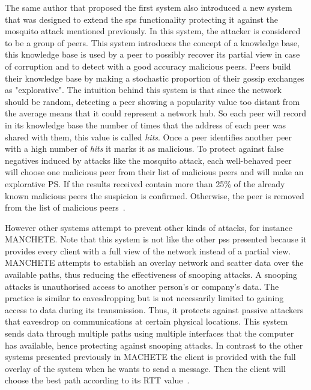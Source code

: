 The same author that proposed the first system also introduced a new system that was designed to extend the \acrshort{sps} functionality protecting it against the mosquito attack mentioned previously. In this system, the attacker is considered to be a group of peers. This system introduces the concept of a knowledge base, this knowledge base is used by a peer to possibly recover its partial view in case of corruption and to detect with a good accuracy malicious peers. Peers build their knowledge base by making a stochastic proportion of their gossip exchanges as "explorative". The intuition behind this system is that since the network should be random, detecting a peer showing a popularity value too distant from the average means that it could represent a network hub. So each peer will record in its knowledge base the number of times that the address of each peer was shared with them, this value is called \textit{hits}. Once a peer identifies another peer with a high number of \textit{hits} it marks it as malicious. To protect against false negatives induced by attacks like the mosquito attack, each well-behaved peer will choose one malicious peer from their list of malicious peers and will make an explorative PS. If the results received contain more than 25\% of the already known malicious peers the suspicion is confirmed. Otherwise, the peer is removed from the list of malicious peers~\cite{jesi2009secure}.

However other systems attempt to prevent other kinds of attacks, for instance MANCHETE. Note that this system is not like the other \acrshort{pss} presented because it provides every client with a full view of the network instead of a partial view. MANCHETE attempts to establish an overlay network and scatter data over the available paths, thus reducing the effectiveness of snooping attacks. A snooping attacks is unauthorised access to another person's or company's data. The practice is similar to eavesdropping but is not necessarily limited to gaining access to data during its transmission. Thus, it protects against passive attackers that eavesdrop on communications at certain physical locations. This system sends data through multiple paths using multiple interfaces that the computer has available, hence protecting against snooping attacks. In contrast to the other systems presented previously in MACHETE the client is provided with the full overlay of the system when he wants to send a message. Then the client will choose the best path according to its RTT value~\cite{raposo2016machete}.

